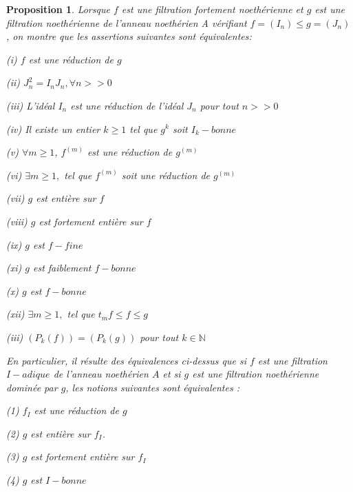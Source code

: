 \documentclass[12pt, a4paper, oneside]{book}
\newtheorem{maproposition}{Proposition}[chapter]
\begin{document}
\begin{maproposition}
	Lorsque $f$ est une filtration fortement noethérienne et $g$ est une
	filtration noethérienne de l'anneau noethérien A vérifiant $
	f=(I_{n})\leq g=(J_{n})$, on montre que les assertions suivantes sont équivalentes:
	
	(i) $f$ est une réduction de $g$
	
	(ii) $J_{n}^{2}=I_{n}J_{n},\forall n>>0$
	
	(iii) L'idéal $I_{n}$ est une réduction de l'idéal $J_{n}$ pour
	tout $n>>0$
	
	(iv) Il existe un entier $k\geq 1$ tel que $g^{k}$ soit $I_{k}-bonne$
	
	(v) $\forall m\geq 1$, $f^{(m)}$ est une réduction de $g^{(m)}$
	
	(vi) $\exists m\geq 1,$ tel que $f^{(m)}$ soit une réduction de $g^{(m)}$
	
	(vii) $g$ est entière sur $f$
	
	(viii) $g$ est fortement entière sur $f$
	
	(ix) $g$ est $f-fine$
	
	(xi) $g$ est faiblement $f-bonne$
	
	(x) $g$ est $f-bonne$
	
	(xii) $\exists m\geq 1,$ tel que $t_{m}f\leq f\leq g$
	
	(iii) $(P_{k}(f))=(P_{k}(g))$ pour tout $k\in\mathbb{N}$
	
	En particulier, il résulte des équivalences ci-dessus que si $f$ est une filtration $I-adique$ de l'anneau noethérien $A$ et si $g$ est
	une filtration noethérienne dominée par $g$, les notions suivantes
	sont équivalentes :
	
	(1) $f_{I}$ est une réduction de $g$
	
	(2) $g$ est entière sur $f_{I}$.
	
	(3) $g$ est fortement entière sur $f_{I}$
	
	(4) $g$ est $I-bonne$
	
\end{maproposition}
\end{document}
